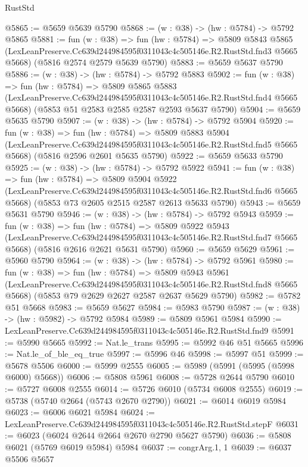 \begin{lexlean}{RustStd}
\begin{coremodule}
@5865 := @5659 @5639 @5790
@5868 := (w : @38) -> (hw : @5784) -> @5792 @5865
@5881 := fun (w : @38) =>
  fun (hw : @5784) =>
  @5809
    @5843
    @5865
    (LexLeanPreserve.Cc639d244984595f0311043c4c505146e.R2.RustStd.fnd3 @5665 @5668)
    (@5816 @2574 @2579 @5639 @5790)
@5883 := @5659 @5637 @5790
@5886 := (w : @38) -> (hw : @5784) -> @5792 @5883
@5902 := fun (w : @38) =>
  fun (hw : @5784) =>
  @5809
    @5865
    @5883
    (LexLeanPreserve.Cc639d244984595f0311043c4c505146e.R2.RustStd.fnd4 @5665 @5668)
    (@5853 @51 @2583 @2585 @2587 @2593 @5637 @5790)
@5904 := @5659 @5635 @5790
@5907 := (w : @38) -> (hw : @5784) -> @5792 @5904
@5920 := fun (w : @38) =>
  fun (hw : @5784) =>
  @5809
    @5883
    @5904
    (LexLeanPreserve.Cc639d244984595f0311043c4c505146e.R2.RustStd.fnd5 @5665 @5668)
    (@5816 @2596 @2601 @5635 @5790)
@5922 := @5659 @5633 @5790
@5925 := (w : @38) -> (hw : @5784) -> @5792 @5922
@5941 := fun (w : @38) =>
  fun (hw : @5784) =>
  @5809
    @5904
    @5922
    (LexLeanPreserve.Cc639d244984595f0311043c4c505146e.R2.RustStd.fnd6 @5665 @5668)
    (@5853 @73 @2605 @2515 @2587 @2613 @5633 @5790)
@5943 := @5659 @5631 @5790
@5946 := (w : @38) -> (hw : @5784) -> @5792 @5943
@5959 := fun (w : @38) =>
  fun (hw : @5784) =>
  @5809
    @5922
    @5943
    (LexLeanPreserve.Cc639d244984595f0311043c4c505146e.R2.RustStd.fnd7 @5665 @5668)
    (@5816 @2616 @2621 @5631 @5790)
@5960 := @5659 @5629
@5961 := @5960 @5790
@5964 := (w : @38) -> (hw : @5784) -> @5792 @5961
@5980 := fun (w : @38) =>
  fun (hw : @5784) =>
  @5809
    @5943
    @5961
    (LexLeanPreserve.Cc639d244984595f0311043c4c505146e.R2.RustStd.fnd8 @5665 @5668)
    (@5853 @79 @2629 @2627 @2587 @2637 @5629 @5790)
@5982 := @5782 @51 @5668
@5983 := @5659 @5627
@5984 := @5983 @5790
@5987 := (w : @38) -> (hw : @5982) -> @5792 @5984
@5989 := @5809 @5961 @5984
@5990 := LexLeanPreserve.Cc639d244984595f0311043c4c505146e.R2.RustStd.fnd9
@5991 := @5990 @5665
@5992 := Nat.le_trans
@5995 := @5992 @46 @51 @5665
@5996 := Nat.le_of_ble_eq_true
@5997 := @5996 @46
@5998 := @5997 @51
@5999 := @5678 @5506
@6000 := @5999 @2555
@6005 := @5989 (@5991 (@5995 (@5998 @6000) @5668))
@6006 := @5808 @5961
@6008 := @5728 @2644 @5790
@6010 := @5727 @6008 @2555
@6014 := @5726 @6010 (@5734 @6008 @2555)
@6019 := @5738 (@5740 @2664 (@5743 @2670 @2790))
@6021 := @6014 @6019 @5984
@6023 := @6006 @6021 @5984
@6024 := LexLeanPreserve.Cc639d244984595f0311043c4c505146e.R2.RustStd.stepF
@6031 := @6023 (@6024 @2644 @2664 @2670 @2790 @5627 @5790)
@6036 := @5808 @6021 (@5769 @6019 @5984) @5984
@6037 := congrArg.{1, 1}
@6039 := @6037 @5506 @5657

\end{coremodule}
\end{lexlean}
